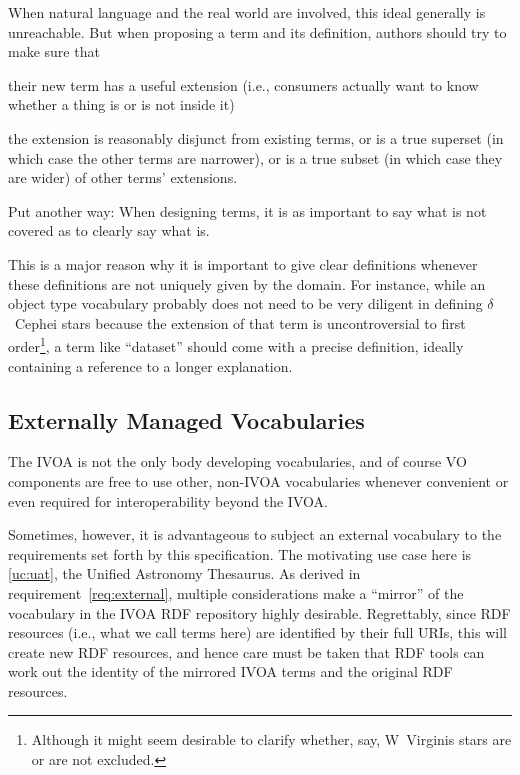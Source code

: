 \documentclass[11pt,a4paper]{ivoa}
\begin{document}
When natural language and the real world are involved, 
this ideal generally is unreachable.
But when proposing a term and its definition, authors should try to
make sure that 

\begin{compactenum}
\item their new term has a useful extension (i.e., consumers actually
want to know whether a thing is or is not inside it)
\item the extension is reasonably disjunct from existing terms, or is a
true superset (in which case the other terms are narrower), or is a true
subset (in which case they are wider) of other terms' extensions.
\end{compactenum}

Put another way: When designing terms, it is as important to say what is
not covered as to clearly say what is.

This is a major reason why it is important to give clear definitions
whenever these definitions are not uniquely given by the domain.  For
instance, while an object type vocabulary probably does not need to be
very diligent in defining $\delta$~Cephei stars because the extension of
that term is uncontroversial to first order\footnote{Although it might
seem desirable to clarify whether, say, W~Virginis stars are or are not
excluded.}, a term like ``dataset'' should come with a precise
definition, ideally containing a reference to a longer explanation.

\subsection{Externally Managed Vocabularies}
\label{sect:externally-managed}

The IVOA is not the only body developing vocabularies, and of course VO
components are free to use other, non-IVOA vocabularies whenever
convenient or even required for interoperability beyond the IVOA.

Sometimes, however, it is advantageous to subject an external vocabulary
to the requirements set forth by this specification.  The motivating use
case here is \ref{uc:uat}, the Unified Astronomy Thesaurus.  As derived
in requirement~\ref{req:external}, multiple considerations make a
``mirror'' of the vocabulary in the IVOA RDF repository highly
desirable.  Regrettably, since RDF resources (i.e., what we call terms
here) are identified by their full URIs, this will create new RDF
resources, and hence care must be taken that RDF tools can work out the
identity of the mirrored IVOA terms and the original RDF resources.
\end{document}
